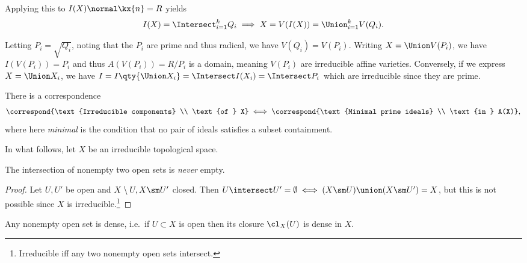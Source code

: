 Applying this to \(I(X) \normal \kx{n} = R\) yields
\begin{align*}  
I(X) = \Intersect_{i=1}^k Q_i 
\implies
X  = V(I(X)) = \Union_{i=1}^k V(Q_i)
.\end{align*}

Letting \(P_i = \sqrt{Q_i}\), noting that the \(P_i\) are prime and thus
radical, we have \(V(Q_i) = V(P_i)\). Writing \(X = \Union V(P_i)\), we
have \(I(V(P_i)) = P_i\) and thus \(A(V(P_i)) = R/P_i\) is a domain,
meaning \(V(P_i)\) are irreducible affine varieties. Conversely, if we
express \(X = \Union X_i\), we have
\(I = I\qty{\Union X_i} = \Intersect I(X_i) = \Intersect P_i\) which are
irreducible since they are prime.

\begin{remark}

There is a correspondence
\begin{align*}  
\correspond{\text{Irreducible components} \\ \text{of } X} 
\iff
\correspond{\text{Minimal prime ideals} \\ \text{in } A(X)}
,\end{align*} where here \emph{minimal} is the condition that no pair of
ideals satisfies a subset containment.

\end{remark}

In what follows, let \(X\) be an irreducible topological space.

\begin{proposition}[1]

The intersection of nonempty two open sets is \emph{never} empty.

\end{proposition}

\begin{proof}

Let \(U, U'\) be open and \(X\setminus U, X\sm U'\) closed. Then
\(U\intersect U' = \emptyset \iff (X\sm U) \union (X\sm U') = X\), but
this is not possible since \(X\) is irreducible.\footnote{Irreducible
  iff any two nonempty open sets intersect.}

\end{proof}

\begin{proposition}[?]

Any nonempty open set is dense, i.e.~if \(U\subset X\) is open then its
closure \(\cl_X(U)\) is dense in \(X\).

\end{proposition}

